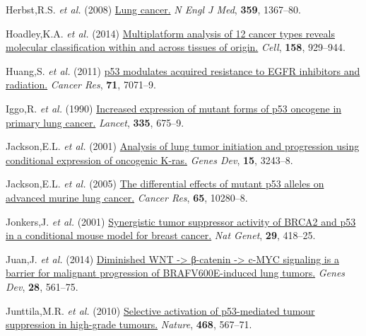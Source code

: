 \begin{CSLReferences}{1}{0}
\leavevmode{}%
Herbst,R.S. \emph{et al.} (2008) \href{https://doi.org/10.1056/nejmra0802714}{Lung cancer.} \emph{N Engl J Med}, \textbf{359}, 1367--80.

\leavevmode{}%
Hoadley,K.A. \emph{et al.} (2014) \href{https://doi.org/10.1016/j.cell.2014.06.049}{Multiplatform analysis of 12 cancer types reveals molecular classification within and across tissues of origin.} \emph{Cell}, \textbf{158}, 929--944.

\leavevmode{}%
Huang,S. \emph{et al.} (2011) \href{https://doi.org/10.1158/0008-5472.can-11-0128}{p53 modulates acquired resistance to EGFR inhibitors and radiation.} \emph{Cancer Res}, \textbf{71}, 7071--9.

\leavevmode{}%
Iggo,R. \emph{et al.} (1990) \href{https://doi.org/10.1016/0140-6736(90)90801-b}{Increased expression of mutant forms of p53 oncogene in primary lung cancer.} \emph{Lancet}, \textbf{335}, 675--9.

\leavevmode{}%
Jackson,E.L. \emph{et al.} (2001) \href{https://doi.org/10.1101/gad.943001}{Analysis of lung tumor initiation and progression using conditional expression of oncogenic K-ras.} \emph{Genes Dev}, \textbf{15}, 3243--8.

\leavevmode{}%
Jackson,E.L. \emph{et al.} (2005) \href{https://doi.org/10.1158/0008-5472.can-05-2193}{The differential effects of mutant p53 alleles on advanced murine lung cancer.} \emph{Cancer Res}, \textbf{65}, 10280--8.

\leavevmode{}%
Jonkers,J. \emph{et al.} (2001) \href{https://doi.org/10.1038/ng747}{Synergistic tumor suppressor activity of BRCA2 and p53 in a conditional mouse model for breast cancer.} \emph{Nat Genet}, \textbf{29}, 418--25.

\leavevmode{}%
Juan,J. \emph{et al.} (2014) \href{https://doi.org/10.1101/gad.233627.113}{Diminished WNT -\textgreater{} β-catenin -\textgreater{} c-MYC signaling is a barrier for malignant progression of BRAFV600E-induced lung tumors.} \emph{Genes Dev}, \textbf{28}, 561--75.

\leavevmode{}%
Junttila,M.R. \emph{et al.} (2010) \href{https://doi.org/10.1038/nature09526}{Selective activation of p53-mediated tumour suppression in high-grade tumours.} \emph{Nature}, \textbf{468}, 567--71.


\end{CSLReferences}
